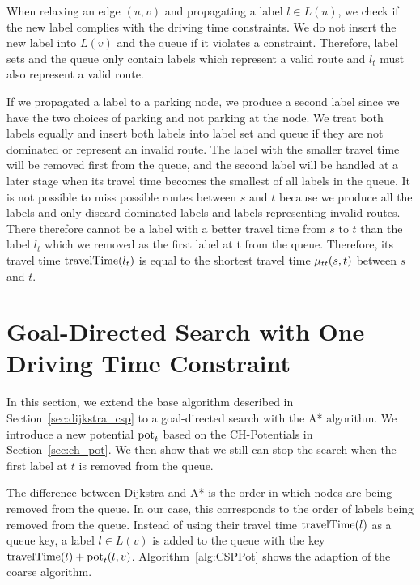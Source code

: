 When relaxing an edge $(u,v)$ and propagating a label $l \in L(u)$, we check if the new label complies with the driving time constraints. We do not insert the new label into $L(v)$ and the queue if it violates a constraint. Therefore, label sets and the queue only contain labels which represent a valid route and $l_t$ must also represent a valid route.

If we propagated a label to a parking node, we produce a second label since we have the two choices of parking and not parking at the node. We treat both labels equally and insert both labels into label set and queue if they are not dominated or represent an invalid route. The label with the smaller travel time will be removed first from the queue, and the second label will be handled at a later stage when its travel time becomes the smallest of all labels in the queue. It is not possible to miss possible routes between $s$ and $t$ because we produce all the labels and only discard dominated labels and labels representing invalid routes. There therefore cannot be a label with a better travel time from $s$ to $t$ than the label $l_t$ which we removed as the first label at t from the queue. Therefore, its travel time $\operatorname{travelTime}(l_t)$ is equal to the shortest travel time $\mu_{tt}(s,t)$ between $s$ and $t$.

\section{Goal-Directed Search with One Driving Time Constraint}
In this section, we extend the base algorithm described in Section~\ref{sec:dijkstra_csp} to a goal-directed search with the A* algorithm. We introduce a new potential $\operatorname{pot}_t$ based on the CH-Potentials in Section~\ref{sec:ch_pot}. We then show that we still can stop the search when the first label at $t$ is removed from the queue.

The difference between Dijkstra and A* is the order in which nodes are being removed from the queue. In our case, this corresponds to the order of labels being removed from the queue. Instead of using their travel time $\operatorname{travelTime}(l)$ as a queue key, a label $l \in L(v)$ is added to the queue with the key $\operatorname{travelTime}(l) + \operatorname{pot}_t(l,v)$. Algorithm~\ref{alg:CSPPot} shows the adaption of the coarse algorithm.

